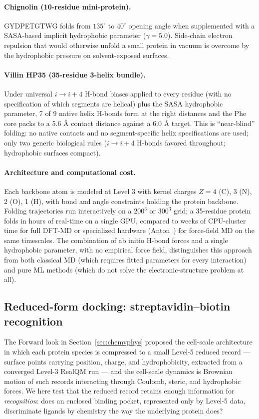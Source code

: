 \documentclass[11pt]{article}
\begin{document}
\paragraph{Chignolin (10-residue mini-protein).}
GYDPETGTWG folds from $135^\circ$ to $40^\circ$ opening angle when supplemented with a SASA-based implicit hydrophobic parameter ($\gamma = 5.0$). Side-chain electron repulsion that would otherwise unfold a small protein in vacuum is overcome by the hydrophobic pressure on solvent-exposed surfaces.

\paragraph{Villin HP35 (35-residue 3-helix bundle).}
Under universal $i \to i{+}4$ H-bond biases applied to every residue (with no specification of which segments are helical) plus the SASA hydrophobic parameter, 7 of 9 native helix H-bonds form at the right distances and the Phe core packs to a 5.6 \AA{} contact distance against a 6.0 \AA{} target. This is ``near-blind'' folding: no native contacts and no segment-specific helix specifications are used; only two generic biological rules ($i \to i{+}4$ H-bonds favored throughout; hydrophobic surfaces compact).

\paragraph{Architecture and computational cost.}
Each backbone atom is modeled at Level 3 with kernel charges $Z = 4$ (C), 3 (N), 2 (O), 1 (H), with bond and angle constraints holding the protein backbone. Folding trajectories run interactively on a $200^3$ or $300^3$ grid; a 35-residue protein folds in hours of real-time on a single GPU, compared to weeks of CPU-cluster time for full DFT-MD or specialized hardware (Anton~\cite{Shaw10}) for force-field MD on the same timescales. The combination of ab initio H-bond forces and a single hydrophobic parameter, with no empirical force field, distinguishes this approach from both classical MD (which requires fitted parameters for every interaction) and pure ML methods (which do not solve the electronic-structure problem at all).

\subsection{Reduced-form docking: streptavidin--biotin recognition}\label{sec:reduced-docking}

The Forward look in Section~\ref{sec:chemvphys} proposed the cell-scale architecture in which each protein species is compressed to a small Level-5 reduced record --- surface points carrying position, charge, and hydrophobicity, extracted from a converged Level-3 RealQM run --- and the cell-scale dynamics is Brownian motion of such records interacting through Coulomb, steric, and hydrophobic forces. We here test that the reduced record retains enough information for \emph{recognition}: does an enclosed binding pocket, represented only by Level-5 data, discriminate ligands by chemistry the way the underlying protein does?
\end{document}
